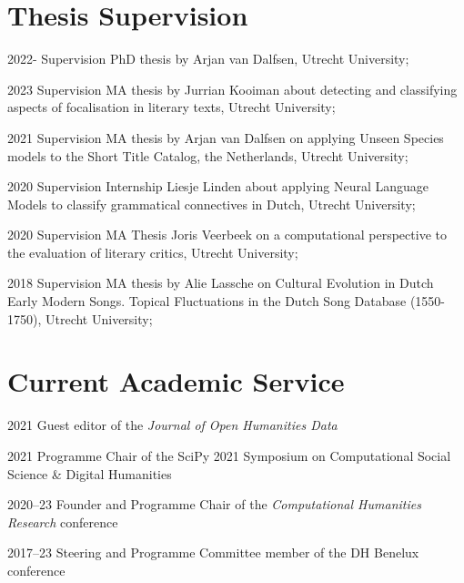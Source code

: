 \documentclass[12pt,letterpaper]{report}
\begin{document}
\section*{Thesis Supervision}
\begin{tablist}
  \item[2022-] \tab{}Supervision PhD thesis by Arjan van Dalfsen, Utrecht University;
  \item[2023] \tab{}Supervision MA thesis by Jurrian Kooiman about detecting and
    classifying aspects of focalisation in literary texts, Utrecht University;
  \item[2021] \tab{}Supervision MA thesis by Arjan van Dalfsen on applying
    Unseen Species models to the Short Title Catalog, the Netherlands, Utrecht University;
  \item[2020] \tab{}Supervision Internship Liesje Linden about applying Neural Language
    Models to classify grammatical connectives in Dutch, Utrecht University;
  \item[2020] \tab{}Supervision MA Thesis Joris Veerbeek on a computational perspective to
    the evaluation of literary critics, Utrecht University;
  \item[2018] \tab{} Supervision MA thesis by Alie Lassche on Cultural Evolution
    in Dutch Early Modern Songs. Topical Fluctuations in the Dutch Song Database
    (1550-1750), Utrecht University;
\end{tablist}

\section*{Current Academic Service}
\begin{tablist}
\item[2021] \tab{}Guest editor of the \textit{Journal of Open Humanities Data}
\item[2021] \tab{}Programme Chair of the SciPy 2021 Symposium on Computational Social Science
  \& Digital Humanities
\item[2020--23] \tab{}Founder and Programme Chair of the \textit{Computational Humanities
    Research} conference
\item[2017--23] \tab{}Steering and Programme Committee member of the DH Benelux conference
\end{tablist}
\end{document}

